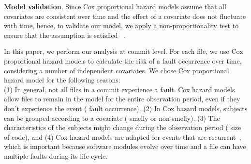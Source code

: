 \textbf{Model validation}. Since Cox proportional hazard models assume that all covariates are consistent over time and the effect of a covariate does not fluctuate with time, hence, to validate our model, we apply a non-proportionality test to ensure that the assumption is satisfied~\cite{therneau2000modeling} \cite{selim2010studying}.

In this paper, we perform our analysis at commit level. For each file, we use Cox proportional hazard models to calculate the risk of a fault occurrence over time, considering a number of independent covariates. We chose Cox proportional hazard model for the following reasons:\\
(1) In general, not all files in a commit experience a fault. Cox hazard models allow files to remain in the model for the entire observation period, even if they don't experience the event (\ie{} fault occurrence). (2) In Cox hazard models, subjects can be grouped according to a covariate (\eg{} smelly or non-smelly). (3) The characteristics of the subjects might change during the observation period (\eg{} size of code), and (4) Cox hazard models are adapted for events that are recurrent~\cite{therneau2000modeling}, which is important because software modules evolve over time and a file can have multiple faults during its life cycle. 